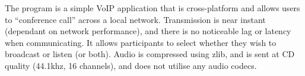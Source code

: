 The program is a simple Vo\+I\+P application that is cross-\/platform and allows users to “conference call” across a local network. Transmission is near instant (dependant on network performance), and there is no noticeable lag or latency when communicating. It allows participants to select whether they wish to broadcast or listen (or both). Audio is compressed using zlib, and is sent at C\+D quality (44.\+1khz, 16 channels), and does not utilise any audio codecs. 